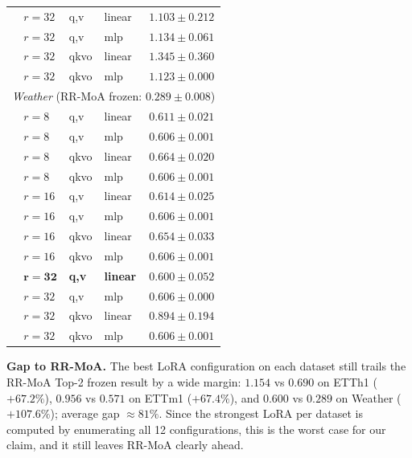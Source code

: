 \documentclass{article}
\begin{document}
\begin{table}[!htbp]
\begin{tabular}{@{}llllc@{}}
& $r{=}32$ & q,v   & linear & $1.103 \pm 0.212$ \\
& $r{=}32$ & q,v   & mlp    & $1.134 \pm 0.061$ \\
& $r{=}32$ & qkvo  & linear & $1.345 \pm 0.360$ \\
& $r{=}32$ & qkvo  & mlp    & $1.123 \pm 0.000$ \\
\midrule
\multicolumn{5}{l}{\textit{Weather} (RR-MoA frozen: $\mathbf{0.289 \pm 0.008}$)} \\
& $r{=}8$  & q,v   & linear & $0.611 \pm 0.021$ \\
& $r{=}8$  & q,v   & mlp    & $0.606 \pm 0.001$ \\
& $r{=}8$  & qkvo  & linear & $0.664 \pm 0.020$ \\
& $r{=}8$  & qkvo  & mlp    & $0.606 \pm 0.001$ \\
& $r{=}16$ & q,v   & linear & $0.614 \pm 0.025$ \\
& $r{=}16$ & q,v   & mlp    & $0.606 \pm 0.001$ \\
& $r{=}16$ & qkvo  & linear & $0.654 \pm 0.033$ \\
& $r{=}16$ & qkvo  & mlp    & $0.606 \pm 0.001$ \\
& $\mathbf{r{=}32}$ & \textbf{q,v} & \textbf{linear} & $\mathbf{0.600 \pm 0.052}$ \\
& $r{=}32$ & q,v   & mlp    & $0.606 \pm 0.000$ \\
& $r{=}32$ & qkvo  & linear & $0.894 \pm 0.194$ \\
& $r{=}32$ & qkvo  & mlp    & $0.606 \pm 0.001$ \\
\bottomrule
\end{tabular}
\end{table}

\textbf{Gap to RR-MoA.} The best LoRA configuration on each dataset still trails the RR-MoA Top-2 frozen result by a wide margin: $1.154$ vs $0.690$ on ETTh1 ($+67.2\%$), $0.956$ vs $0.571$ on ETTm1 ($+67.4\%$), and $0.600$ vs $0.289$ on Weather ($+107.6\%$); average gap ${\approx}81\%$. Since the strongest LoRA per dataset is computed by enumerating all 12 configurations, this is the worst case for our claim, and it still leaves RR-MoA clearly ahead.
\end{document}
